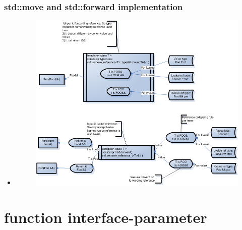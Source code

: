 \documentclass[a4paper,12pt,twoside]{book}
\begin{document}
\subsubsection{std::move and std::forward implementation}
\begin{itemize}
	\item 
	\begin{figure}
		\centering
		\includegraphics[width=0.7\linewidth]{pics/rvalue_ref}
		\caption{}
		\label{fig:rvalueref}
	\end{figure}
	
\end{itemize}


\section{function interface-parameter}
\end{document}
